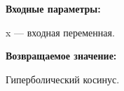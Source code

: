 \textbf{Входные параметры:}

 x --- входная переменная.

\textbf{Возвращаемое значение:}

Гиперболический косинус.
